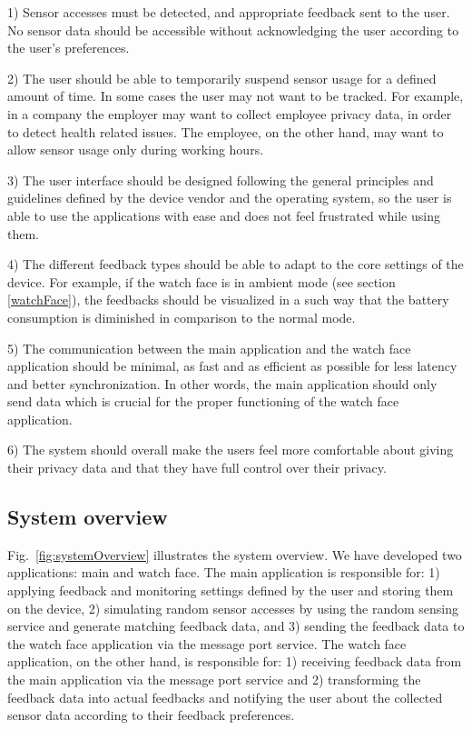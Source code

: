 \documentclass[conference, a4paper, 10pt, twocolumn]{IEEEtran}
\begin{document}
1) Sensor accesses must be detected, and appropriate feedback sent to the user. No sensor data should be accessible without acknowledging the user according to the user's preferences. 

2) The user should be able to temporarily suspend sensor usage for a defined amount of time. In some cases the user may not want to be tracked. For example, in a company the employer may want to collect employee privacy data, in order to detect health related issues. The employee, on the other hand, may want to allow sensor usage only during working hours. 

3) The user interface should be designed following the general principles and guidelines defined by the device vendor and the operating system, so the user is able to use the applications with ease and does not feel frustrated while using them. 

4) The different feedback types should be able to adapt to the core settings of the device. For example, if the watch face is in ambient mode (see section \ref{watchFace}), the feedbacks should be visualized in a such way that the battery consumption is diminished in comparison to the normal mode. 

5) The communication between the main application and the watch face application should be minimal, as fast and as efficient as possible for less latency and better synchronization. In other words, the main application should only send data which is crucial for the proper functioning of the watch face application. 

6) The system should overall make the users feel more comfortable about giving their privacy data and that they have full control over their privacy.   

\subsection{\textbf{System overview}}

Fig.~\ref{fig:systemOverview} illustrates the system overview. We have developed two applications: main and watch face. The main application is responsible for: 1) applying feedback and monitoring settings defined by the user and storing them on the device, 2) simulating random sensor accesses by using the random sensing service and generate matching feedback data, and 3) sending the feedback data to the watch face application via the message port service. The watch face application, on the other hand, is responsible for: 1) receiving feedback data from the main application via the message port service and 2) transforming the feedback data into actual feedbacks and notifying the user about the collected sensor data according to their feedback preferences.
\end{document}
